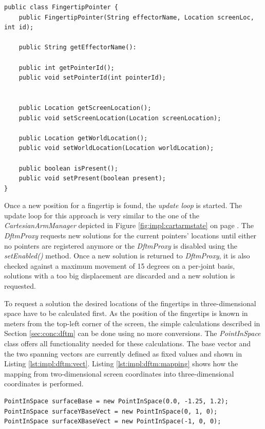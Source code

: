 \begin{lstlisting}[caption={Public interface of the FingertipPointer class},label=lst:impl:dftm:fingertip]
public class FingertipPointer {
	public FingertipPointer(String effectorName, Location screenLoc, int id);
	
	public String getEffectorName():
	
	public int getPointerId();
	public void setPointerId(int pointerId);
	
	
	public Location getScreenLocation();
	public void setScreenLocation(Location screenLocation);
	
	public Location getWorldLocation();
	public void setWorldLocation(Location worldLocation);
	
	public boolean isPresent();
	public void setPresent(boolean present);
}
\end{lstlisting}

Once a new position for a fingertip is found, the \textit{update loop} is started. The update loop for this approach is very similar to the one of the \textit{CartesianArmManager} depicted in Figure \ref{fig:impl:cartarmstate} on page \pageref{fig:impl:cartarmstate}. The \textit{DftmProxy} requests new solutions for the current pointers' locations until either no pointers are registered anymore or the \textit{DftmProxy} is disabled using the \textit{setEnabled()} method. Once a new solution is returned to \textit{DftmProxy}, it is also checked against a maximum movement of 15 degrees on a per-joint basis, solutions with a too big displacement are discarded and a new solution is requested.

To request a solution the desired locations of the fingertips in three-dimensional space have to be calculated first. As the position of the fingertips is known in meters from the top-left corner of the screen, the simple calculations described in Section \ref{sec:conc:dftm} can be done using no more conversions. The \textit{PointInSpace} class offers all functionality needed for these calculations. The base vector and the two spanning vectors are currently defined as fixed values and shown in Listing \ref{lst:impl:dftm:vect}. Listing \ref{lst:impl:dftm:mapping} shows how the mapping from two-dimensional screen coordinates into three-dimensional coordinates is performed.

\begin{lstlisting}[caption={Vectors used for planar mapping},label=lst:impl:dftm:vect]
PointInSpace surfaceBase = new PointInSpace(0.0, -1.25, 1.2);
PointInSpace surfaceYBaseVect = new PointInSpace(0, 1, 0);
PointInSpace surfaceXBaseVect = new PointInSpace(-1, 0, 0);
\end{lstlisting}

